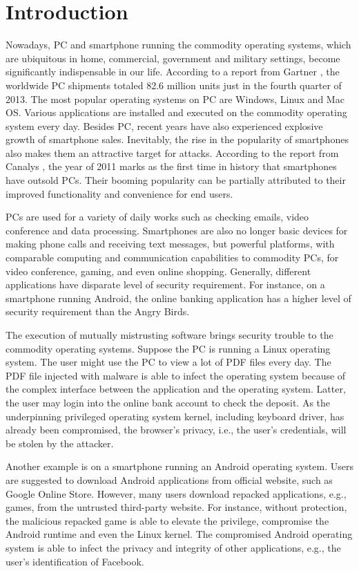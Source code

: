 \section{Introduction}
\label{sec:introduction}

Nowadays, PC and smartphone running the commodity operating systems, which are
ubiquitous in home, commercial, government and military settings, become
significantly indispensable in our life. According to a report from Gartner
\cite{Gartner}, the worldwide PC shipments totaled 82.6 million units just in
the fourth quarter of 2013. The most popular operating systems on PC are
Windows, Linux and Mac OS. Various applications are installed and executed on
the commodity operating system every day. Besides PC, recent years have also
experienced explosive growth of smartphone sales. Inevitably, the rise in the
popularity of smartphones also makes them an attractive target for attacks.
According to the report from Canalys \cite{Canalys}, the year of 2011 marks as
the first time in history that smartphones have outsold PCs. Their booming
popularity can be partially attributed to their improved functionality and
convenience for end users. 

PCs are used for a variety of daily works such as checking emails, video
conference and data processing. Smartphones are also no longer basic devices
for making phone calls and receiving text messages, but powerful platforms,
with comparable computing and communication capabilities to commodity PCs, for
video conference, gaming, and even online shopping. Generally, different
applications have disparate level of security requirement. For instance, on a
smartphone running Android, the online banking application has a higher level
of security requirement than the Angry Birds.

The execution of mutually mistrusting software brings security trouble to the
commodity operating systems. Suppose the PC is running a Linux operating
system. The user might use the PC to view a lot of PDF files every day. The PDF
file injected with malware is able to infect the operating system because of
the complex interface between the application and the operating system. Latter,
the user may login into the online bank account to check the deposit. As the
underpinning privileged operating system kernel, including keyboard driver, has
already been compromised, the browser's privacy, i.e., the user's credentials,
will be stolen by the attacker.

Another example is on a smartphone running an Android operating system. Users
are suggested to download Android applications from official website, such as
Google Online Store. However, many users download repacked applications, e.g.,
games, from the untrusted third-party website. For instance, without
protection, the malicious repacked game is able to elevate the privilege,
compromise the Android runtime and even the Linux kernel. The compromised
Android operating system is able to infect the privacy and integrity of other
applications, e.g., the user's identification of Facebook.

